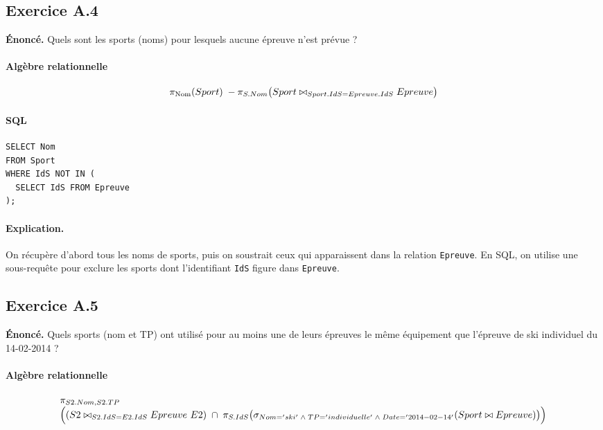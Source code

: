 \documentclass[11pt]{article}
\begin{document}
\subsection*{Exercice A.4}
\textbf{Énoncé.} Quels sont les sports (noms) pour lesquels aucune épreuve n'est prévue ?\\

\paragraph{Algèbre relationnelle}
\[
\pi_{\text{Nom}}(Sport) \\
\; - \\
\pi_{S.Nom}\bigl(Sport \bowtie_{Sport.IdS = Epreuve.IdS} Epreuve\bigr)
\]

\paragraph{SQL}
\begin{verbatim}
SELECT Nom
FROM Sport
WHERE IdS NOT IN (
  SELECT IdS FROM Epreuve
);
\end{verbatim}

\paragraph{Explication.}
On récupère d'abord tous les noms de sports, puis on soustrait ceux qui apparaissent dans la relation \texttt{Epreuve}. En SQL, on utilise une sous-requête pour exclure les sports dont l'identifiant \texttt{IdS} figure dans \texttt{Epreuve}.

\subsection*{Exercice A.5}
\textbf{Énoncé.} Quels sports (nom et TP) ont utilisé pour au moins une de leurs épreuves le même équipement que l'épreuve de ski individuel du 14-02-2014 ?\\

\paragraph{Algèbre relationnelle}
\[
\begin{array}{l}
\pi_{S2.Nom,S2.TP} \\ \Bigl(
  (S2 \bowtie_{S2.IdS=E2.IdS} Epreuve\ E2)
  \;
  \cap
  \;
  \pi_{S.IdS}\bigl(
    \sigma_{Nom='ski'\;\wedge\;TP='individuelle'\;\wedge\;Date='2014-02-14'}
      (Sport \bowtie Epreuve)
  \bigr)
\Bigr)
\end{array}
\]
\end{document}
